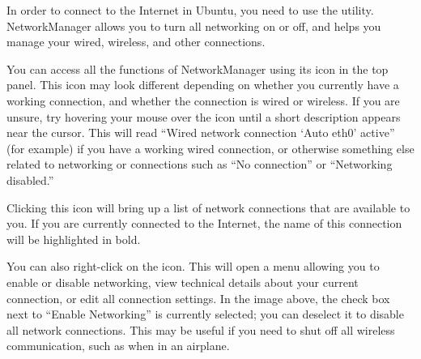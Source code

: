 In order to connect to the Internet in Ubuntu, you need to use 
the  utility. NetworkManager allows you 
to turn all networking on or off, and helps you manage your wired, 
wireless, and other connections.



You can access all the functions of NetworkManager using its icon in the top panel. This icon may look different depending on whether you currently have a working connection, and whether the connection is wired or wireless. If you are unsure, try hovering your mouse over the icon until a short description appears near the cursor. This will read ``Wired network connection `Auto eth$0$' active'' (for example) if you have a working wired connection, or otherwise something else related to networking or connections such as ``No connection'' or ``Networking disabled.''


Clicking this icon will bring up a list of network connections that are available to you. If you are currently connected to the Internet, the name of this connection will be highlighted in bold.


You can also right-click on the  icon. This will open a menu allowing you to enable or disable networking, view technical details about your current connection, or edit all 
connection settings. In the image above, the check box next to ``Enable Networking'' is currently selected; you can deselect it to disable all network connections. This may be useful if you need to shut off all wireless communication, such as when in an airplane.

